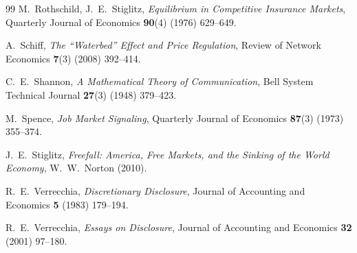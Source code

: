 \documentclass[12pt,a4paper]{article}
\begin{document}
\begin{thebibliography}{99}
M.~Rothschild, J.~E.~Stiglitz,
\textit{Equilibrium in Competitive Insurance Markets},
Quarterly Journal of Economics \textbf{90}(4) (1976) 629--649.

A.~Schiff,
\textit{The ``Waterbed'' Effect and Price Regulation},
Review of Network Economics \textbf{7}(3) (2008) 392--414.

C.~E.~Shannon,
\textit{A Mathematical Theory of Communication},
Bell System Technical Journal \textbf{27}(3) (1948) 379--423.

M.~Spence,
\textit{Job Market Signaling},
Quarterly Journal of Economics \textbf{87}(3) (1973) 355--374.

J.~E.~Stiglitz,
\textit{Freefall: America, Free Markets, and the Sinking of the World Economy},
W.~W.~Norton (2010).

R.~E.~Verrecchia,
\textit{Discretionary Disclosure},
Journal of Accounting and Economics \textbf{5} (1983) 179--194.

R.~E.~Verrecchia,
\textit{Essays on Disclosure},
Journal of Accounting and Economics \textbf{32} (2001) 97--180.

\end{thebibliography}
\end{document}
